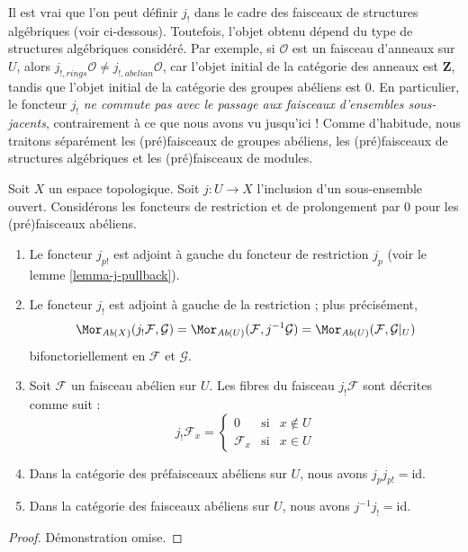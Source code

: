 \noindent
Il est vrai que l'on peut définir $j_!$ dans le cadre des faisceaux
de structures algébriques (voir ci-dessous). Toutefois, l'objet
obtenu dépend du type de structures algébriques considéré.
Par exemple, si $\mathcal{O}$ est un faisceau d'anneaux
sur $U$, alors $j_{!, rings}\mathcal{O} \not = j_{!, abelian}\mathcal{O}$,
car l'objet initial de la catégorie des anneaux
est $\mathbf{Z}$, tandis que l'objet initial de la catégorie
des groupes abéliens est $0$. En particulier, le foncteur $j_!$
{\it ne commute pas avec le passage aux faisceaux d'ensembles sous-jacents},
contrairement à ce que nous avons vu jusqu'ici ! Comme d'habitude, nous traitons séparément
les (pré)faisceaux de groupes abéliens, les (pré)faisceaux de structures algébriques
et les (pré)faisceaux de modules.

\begin{lemma}
\label{lemma-j-shriek-abelian}
Soit $X$ un espace topologique.
Soit $j : U \to X$ l'inclusion d'un sous-ensemble ouvert.
Considérons les foncteurs de restriction et de prolongement
par $0$ pour les (pré)faisceaux abéliens.
\begin{enumerate}
\item Le foncteur $j_{p!}$ est adjoint à gauche du
foncteur de restriction $j_p$ (voir le lemme \ref{lemma-j-pullback}).
\item Le foncteur $j_!$ est adjoint à gauche de la restriction ;
plus précisément,
$$
\Mor_{\textit{Ab}(X)}(j_!\mathcal{F}, \mathcal{G})
=
\Mor_{\textit{Ab}(U)}(\mathcal{F}, j^{-1}\mathcal{G})
=
\Mor_{\textit{Ab}(U)}(\mathcal{F}, \mathcal{G}|_U)
$$
bifonctoriellement en $\mathcal{F}$ et $\mathcal{G}$.
\item Soit $\mathcal{F}$ un faisceau abélien sur $U$.
Les fibres du faisceau $j_!\mathcal{F}$ sont décrites
comme suit :
$$
j_{!}\mathcal{F}_x =
\left\{
\begin{matrix}
0 & \text{si} & x \not \in U \\
\mathcal{F}_x & \text{si} & x \in U
\end{matrix}
\right.
$$
\item Dans la catégorie des préfaisceaux abéliens sur $U$,
nous avons $j_pj_{p!} = \text{id}$.
\item Dans la catégorie des faisceaux abéliens sur $U$,
nous avons $j^{-1}j_! = \text{id}$.
\end{enumerate}
\end{lemma}

\begin{proof}
Démonstration omise.
\end{proof}

